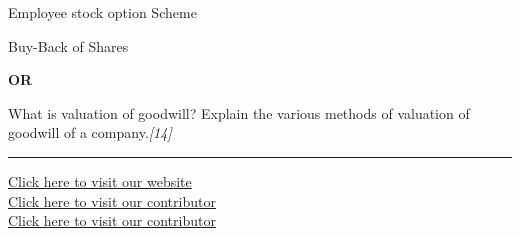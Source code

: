 \documentclass[11pt,a4paper]{article}
\newcommand{\pts}[1]{\hfill   \textit{[#1]}}
\begin{document}
\begin{parts}
  \item Employee stock option Scheme
  \item Buy-Back of Shares
\end{parts}

\centerline{   \textbf{OR}}

What is valuation of goodwill? Explain the various methods of valuation of goodwill of a company.\pts{14}

\vfill
\rule{\linewidth}{0.4pt}

\begin{center}\small
\href{https://bhu-exam.vercel.app/}{Click here to visit our website}\\[4pt]
\href{https://me-aryan.vercel.app/}{Click here to visit our contributor}\\[4pt]
\href{https://quashan-me.vercel.app/}{Click here to visit our contributor}
\end{center}
\end{document}
